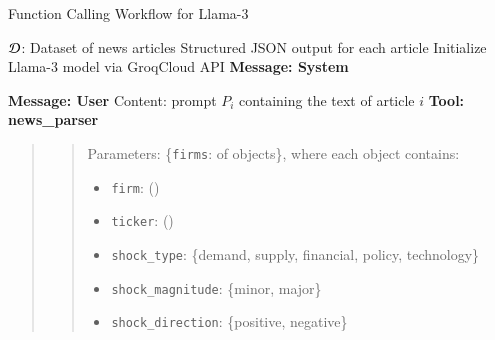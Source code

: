 
\begin{algorithm}[H]
\caption{Function Calling Workflow for Llama-3}
\label{alg:function_calling}
\begin{algorithmic}[1]
\Require $\mathcal{D}$: Dataset of news articles
\Ensure Structured JSON output for each article
\State Initialize Llama-3 model via GroqCloud API
 \Comment{\scalebox{0.9}{\textcolor{lightgray}{Iterate over each article in the dataset}}}
    \State \textbf{Message: System} \Comment{\scalebox{0.9}{\textcolor{lightgray}{Define the role and task for the LLM}}}

		\begin{quote}
		\end{quote}


    \State \textbf{Message: User} \Comment{\scalebox{0.9}{\textcolor{lightgray}{User provides the article text as input}}}
    \Statex \hspace{1cm} Content: prompt $P_i$ containing the text of article $i$
    \State \textbf{Tool: news\_parser} 
%    
\begin{quote}
\begin{quote}
Parameters: \{\texttt{firms}:  of objects\}, where each object contains:
            \begin{itemize}
                \item \texttt{firm}: \hspace{2cm}  ()
                \item \texttt{ticker}: \hspace{1.6cm}  ()
                \item \texttt{shock\_type}: \hspace{0.9cm}  \{demand, supply, financial, policy, technology\}
                \item \texttt{shock\_magnitude}:  \hspace{0.15cm} \{minor, major\}
                \item \texttt{shock\_direction}: \hspace{0.15cm} \{positive, negative\}
            \end{itemize} 
\end{quote} 
\end{quote} 
 

\end{algorithmic}
\end{algorithm}
